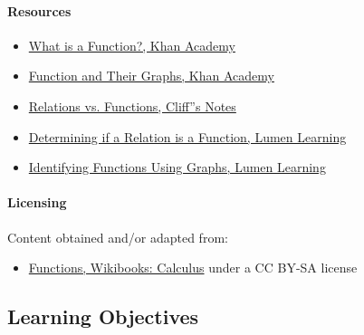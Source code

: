 \paragraph{Resources}

\begin{itemize}
    \item \href{https://www.khanacademy.org/math/algebra/x2f8bb11595b61c86:functions/x2f8bb11595b61c86:evaluating-functions/v/what-is-a-function}{What is a Function?, Khan Academy}
    \item \href{https://www.khanacademy.org/math/algebra2/functions_and_graphs}{Function and Their Graphs, Khan Academy}
    \item \href{https://www.cliffsnotes.com/study-guides/calculus/precalculus/functions/relations-vs-functions}{Relations vs. Functions, Cliff''s Notes}
    \item \href{https://courses.lumenlearning.com/ivytech-collegealgebra/chapter/determine-whether-a-relation-represents-a-function/}{Determining if a Relation is a Function, Lumen Learning}
    \item \href{https://courses.lumenlearning.com/waymakercollegealgebra/chapter/identify-functions-using-graphs/}{Identifying Functions Using Graphs, Lumen Learning}
\end{itemize}

\paragraph{Licensing}

Content obtained and/or adapted from:

\begin{itemize}
    \item \href{https://en.wikibooks.org/wiki/Calculus/Functions}{Functions, Wikibooks: Calculus} under a CC BY-SA license
\end{itemize}

\subsection{Learning Objectives}

